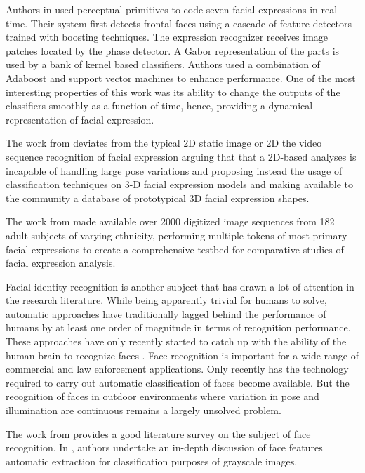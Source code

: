 \documentclass[]{article}
\begin{document}
Authors in \cite{Bartlett4624313} used perceptual primitives to code seven facial expressions in real-time. Their system
first detects frontal faces using a cascade of feature detectors trained with boosting techniques. The expression
recognizer receives image patches located by the phase detector. A Gabor representation of the parts is used  by a bank
of kernel based classifiers. Authors used a combination of Adaboost and support vector machines to enhance performance.
One of the most interesting properties of this work was its ability to change the outputs of the classifiers smoothly
as a function of time, hence, providing a dynamical representation of facial expression.


The work from \cite{lijunyin} deviates from the typical 2D static image or 2D the video sequence recognition of
facial expression arguing that that a 2D-based analyses is incapable of handling large pose variations and proposing
instead the usage of classification techniques on 3-D facial expression models and making available to the community a
database of prototypical 3D facial expression shapes.

 
The work from \cite{Cohn840611} made available over 2000 digitized image sequences from  182 adult subjects of
varying ethnicity, performing multiple tokens of most primary facial expressions to create a comprehensive testbed for
comparative studies of facial expression analysis.


Facial identity recognition is another subject that has drawn a lot of attention in the research literature. While being
apparently trivial for humans to solve, automatic approaches have traditionally lagged behind the performance of humans
by at least one order of magnitude in terms of recognition performance. These approaches have only recently started to
catch up with the ability of the human brain to recognize faces \cite{onintelligence, Rozado2012b}. Face recognition is
important  for a wide range of commercial and law enforcement applications. Only recently has the technology required to
carry out automatic classification of faces become available. But the recognition of faces in outdoor environments 
where variation in pose and illumination are continuous remains a largely unsolved problem.

The work from \cite{Zhao:2003} provides a good literature survey on the subject of face recognition. In
\cite{Craw1987183}, authors undertake an in-depth discussion of face features automatic extraction for classification purposes of
grayscale images.
\end{document}

